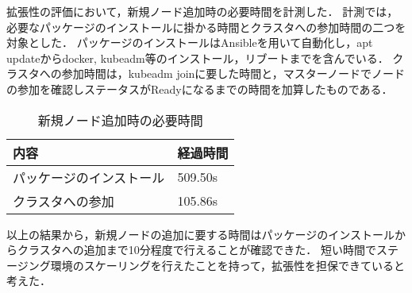 拡張性の評価において，新規ノード追加時の必要時間を計測した．
計測では，必要なパッケージのインストールに掛かる時間とクラスタへの参加時間の二つを対象とした．
パッケージのインストールはAnsibleを用いて自動化し，apt updateからdocker, kubeadm等のインストール，リブートまでを含んでいる．
クラスタへの参加時間は，kubeadm joinに要した時間と，マスターノードでノードの参加を確認しステータスがReadyになるまでの時間を加算したものである．

\begin{table}[htb]
  \begin{center}
    \caption{新規ノード追加時の必要時間}
    \begin{tabular}{|l|l|} \hline
      内容 & 経過時間 \\ \hline
      パッケージのインストール & 509.50s \\ \hline
      クラスタへの参加 & 105.86s \\ \hline
    \end{tabular}
  \end{center}
\end{table}

以上の結果から，新規ノードの追加に要する時間はパッケージのインストールからクラスタへの追加まで10分程度で行えることが確認できた．
短い時間でステージング環境のスケーリングを行えたことを持って，拡張性を担保できていると考えた．

